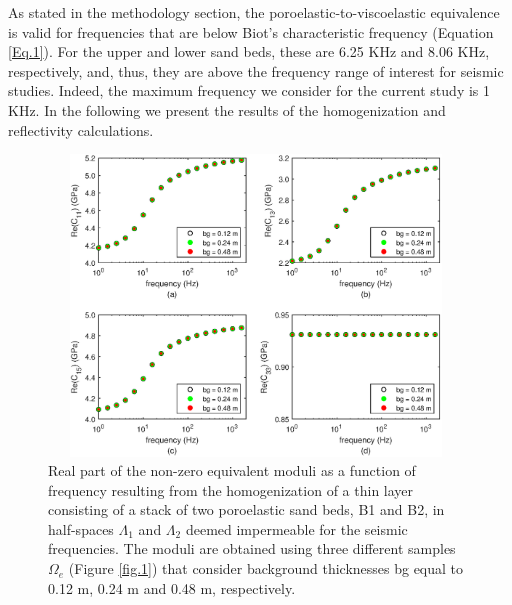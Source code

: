 \documentclass[draft]{agujournal2019}
\begin{document}
As stated in the methodology section, the poroelastic-to-viscoelastic equivalence is valid for frequencies that are below Biot's characteristic frequency (Equation \eqref{Eq.1}). For the upper and lower sand beds, these are 6.25 KHz and 8.06 KHz, respectively, and, thus, they are above the frequency range of interest for seismic studies. Indeed, the maximum frequency we consider for the current study is 1 KHz. 
In the following we present the results of the homogenization and reflectivity calculations.
\begin{figure}[!ht]
\centering
        \includegraphics[width=110mm, height=80mm]{Figure2.eps}
\caption{Real part of the non-zero equivalent moduli as a function of frequency resulting from the homogenization of a thin layer consisting of a stack of two poroelastic sand beds, B1 and B2, in  half-spaces $\Lambda_1$ and $\Lambda_2$ deemed impermeable for the seismic frequencies. The moduli are obtained using three different samples $\Omega_e$ (Figure \ref{fig.1}) that consider background thicknesses bg equal to 0.12 m, 0.24 m and 0.48 m, respectively.}
\label{fig.2}
\end{figure}
\end{document}
